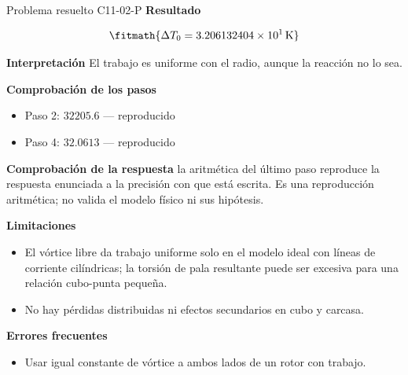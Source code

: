 \documentclass[10pt,openany]{book}
\begin{document}
\begin{studiumworked}{Problema resuelto C11-02-P}
\noindent\textbf{Resultado}

\[
\fitmath{\Delta T_0=3.206132404\times10^{1}\,\mathrm{K}}
\]

\noindent\textbf{Interpretación}
El trabajo es uniforme con el radio, aunque la reacción no lo sea.

\noindent\textbf{Comprobación de los pasos}
\begin{itemize}
\item Paso 2: $32205.6$ — reproducido
\item Paso 4: $32.0613$ — reproducido
\end{itemize}

\noindent\textbf{Comprobación de la respuesta} la aritmética del último paso reproduce la respuesta enunciada a la precisión con que está escrita. Es una reproducción aritmética; no valida el modelo físico ni sus hipótesis.

\noindent\textbf{Limitaciones}
\begin{itemize}
\item El vórtice libre da trabajo uniforme solo en el modelo ideal con líneas de corriente cilíndricas; la torsión de pala resultante puede ser excesiva para una relación cubo-punta pequeña.
\item No hay pérdidas distribuidas ni efectos secundarios en cubo y carcasa.
\end{itemize}

\noindent\textbf{Errores frecuentes}
\begin{itemize}
\item Usar igual constante de vórtice a ambos lados de un rotor con trabajo.
\end{itemize}
\end{studiumworked}
\end{document}
